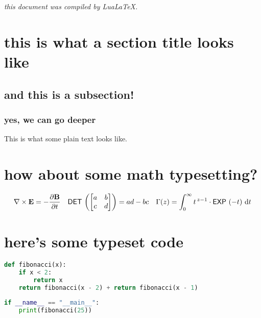 \documentclass[11pt]{article}
\begin{document}
\textit{this document was compiled by LuaLaTeX.}
\section{this is what a section title looks like}
\subsection{and this is a subsection!}
\subsubsection{yes, we can go deeper}
This is what some plain text looks like.

\section{how about some math typesetting?}

\begin{align*}
\nabla \times \vec{E} = - \frac{\Partial{\vec{B}}}{\Partial{t}} &&
\op{det} \left( \begin{bmatrix} a & b \\ c & d \end{bmatrix} \right) = ad - bc &&
\Gamma(z) = \int_0^{\infty} t^{\,z-1} \cdot \op{exp}\left(-t\right) \,\D{t} 
\end{align*}

\section{here's some typeset code}

\begin{lstlisting}[language=Python]
def fibonacci(x):
    if x < 2: 
        return x 
    return fibonacci(x - 2) + return fibonacci(x - 1)
    
if __name__ == "__main__":
    print(fibonacci(25))
\end{lstlisting}
\end{document}
